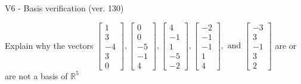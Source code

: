\begin{exercise}
  \begin{exerciseTitle}V6 - Basis verification (ver. 130)\end{exerciseTitle}
  \begin{exerciseStatement}
    Explain why the vectors \(\left[\begin{array}{r}
1 \\
3 \\
-4 \\
3 \\
0
\end{array}\right] , \left[\begin{array}{r}
0 \\
0 \\
-5 \\
-1 \\
4
\end{array}\right] , \left[\begin{array}{r}
4 \\
-1 \\
1 \\
-5 \\
-2
\end{array}\right] , \left[\begin{array}{r}
-2 \\
-1 \\
-1 \\
1 \\
4
\end{array}\right] , \text{ and } \left[\begin{array}{r}
-3 \\
3 \\
-1 \\
3 \\
2
\end{array}\right]\) are or are not a basis of \(\mathbb{R}^5\)	



\end{exerciseStatement}
\end{exercise}
